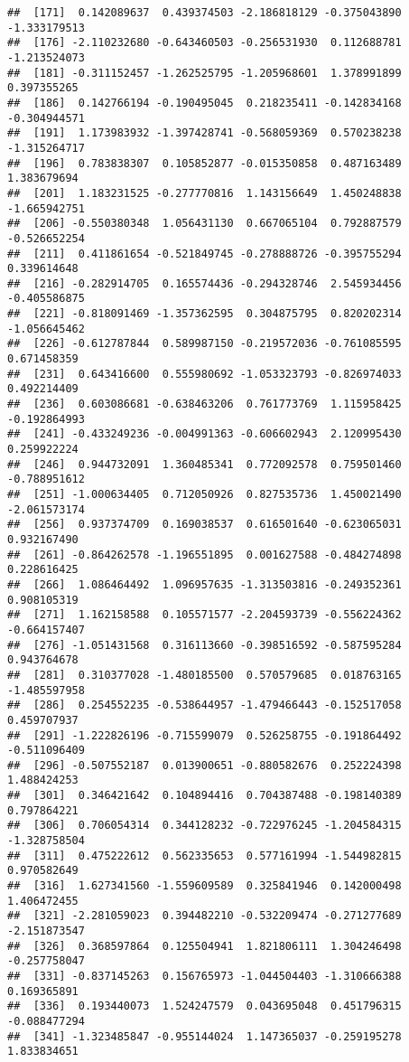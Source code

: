 \documentclass[
]{article}
\begin{document}
\begin{verbatim}
##  [171]  0.142089637  0.439374503 -2.186818129 -0.375043890 -1.333179513
##  [176] -2.110232680 -0.643460503 -0.256531930  0.112688781 -1.213524073
##  [181] -0.311152457 -1.262525795 -1.205968601  1.378991899  0.397355265
##  [186]  0.142766194 -0.190495045  0.218235411 -0.142834168 -0.304944571
##  [191]  1.173983932 -1.397428741 -0.568059369  0.570238238 -1.315264717
##  [196]  0.783838307  0.105852877 -0.015350858  0.487163489  1.383679694
##  [201]  1.183231525 -0.277770816  1.143156649  1.450248838 -1.665942751
##  [206] -0.550380348  1.056431130  0.667065104  0.792887579 -0.526652254
##  [211]  0.411861654 -0.521849745 -0.278888726 -0.395755294  0.339614648
##  [216] -0.282914705  0.165574436 -0.294328746  2.545934456 -0.405586875
##  [221] -0.818091469 -1.357362595  0.304875795  0.820202314 -1.056645462
##  [226] -0.612787844  0.589987150 -0.219572036 -0.761085595  0.671458359
##  [231]  0.643416600  0.555980692 -1.053323793 -0.826974033  0.492214409
##  [236]  0.603086681 -0.638463206  0.761773769  1.115958425 -0.192864993
##  [241] -0.433249236 -0.004991363 -0.606602943  2.120995430  0.259922224
##  [246]  0.944732091  1.360485341  0.772092578  0.759501460 -0.788951612
##  [251] -1.000634405  0.712050926  0.827535736  1.450021490 -2.061573174
##  [256]  0.937374709  0.169038537  0.616501640 -0.623065031  0.932167490
##  [261] -0.864262578 -1.196551895  0.001627588 -0.484274898  0.228616425
##  [266]  1.086464492  1.096957635 -1.313503816 -0.249352361  0.908105319
##  [271]  1.162158588  0.105571577 -2.204593739 -0.556224362 -0.664157407
##  [276] -1.051431568  0.316113660 -0.398516592 -0.587595284  0.943764678
##  [281]  0.310377028 -1.480185500  0.570579685  0.018763165 -1.485597958
##  [286]  0.254552235 -0.538644957 -1.479466443 -0.152517058  0.459707937
##  [291] -1.222826196 -0.715599079  0.526258755 -0.191864492 -0.511096409
##  [296] -0.507552187  0.013900651 -0.880582676  0.252224398  1.488424253
##  [301]  0.346421642  0.104894416  0.704387488 -0.198140389  0.797864221
##  [306]  0.706054314  0.344128232 -0.722976245 -1.204584315 -1.328758504
##  [311]  0.475222612  0.562335653  0.577161994 -1.544982815  0.970582649
##  [316]  1.627341560 -1.559609589  0.325841946  0.142000498  1.406472455
##  [321] -2.281059023  0.394482210 -0.532209474 -0.271277689 -2.151873547
##  [326]  0.368597864  0.125504941  1.821806111  1.304246498 -0.257758047
##  [331] -0.837145263  0.156765973 -1.044504403 -1.310666388  0.169365891
##  [336]  0.193440073  1.524247579  0.043695048  0.451796315 -0.088477294
##  [341] -1.323485847 -0.955144024  1.147365037 -0.259195278  1.833834651

\end{verbatim}
\end{document}
